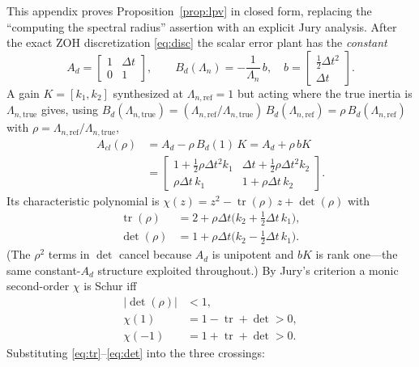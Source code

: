 This appendix proves Proposition~\ref{prop:lpv} in closed form, replacing the ``computing the spectral radius'' assertion with an explicit Jury 
analysis. After the exact ZOH discretization \eqref{eq:disc} the scalar error plant has the \emph{constant}
\begin{equation*}
A_d=\begin{bmatrix}1&\Delta t\\0&1\end{bmatrix},\qquad
B_d(\Lambda_n)=-\frac1{\Lambda_n}\,b,\quad b=\begin{bmatrix}\tfrac12\Delta t^2\\[1pt]\Delta t\end{bmatrix}.
\end{equation*}
A gain $K=[k_1,k_2]$ synthesized at $\Lambda_{n,\text{ref}}=1$ but acting where the true inertia is $\Lambda_{n,\text{true}}$ gives, 
using $B_d(\Lambda_{n,\text{true}})=(\Lambda_{n,\text{ref}}/\Lambda_{n,\text{true}})\,B_d(\Lambda_{n,\text{ref}})=\rho\,B_d(\Lambda_{n,\text{ref}})$ 
with $\rho=\Lambda_{n,\text{ref}}/\Lambda_{n,\text{true}}$,
\begin{align}
A_{cl}(\rho)
&=A_d-\rho\,B_d(1)\,K=A_d+\rho\,bK \nonumber\\
&=\begin{bmatrix}
1+\tfrac12\rho\Delta t^2k_1 &
\Delta t+\tfrac12\rho\Delta t^2k_2\\[2pt]
\rho\Delta t\,k_1 &
1+\rho\Delta t\,k_2
\end{bmatrix}.
\label{eq:Aclrho}
\end{align}
Its characteristic polynomial is $\chi(z)=z^2-\operatorname{tr}(\rho)\,z+\det(\rho)$ with
\begin{align}
\operatorname{tr}(\rho)&=2+\rho\Delta t\big(k_2+\tfrac12\Delta t\,k_1\big),\label{eq:tr}\\
\det(\rho)&=1+\rho\Delta t\big(k_2-\tfrac12\Delta t\,k_1\big).\label{eq:det}
\end{align}
(The $\rho^2$ terms in $\det$ cancel because $A_d$ is unipotent and $bK$ is rank one---the same constant-$A_d$ structure exploited throughout.) 
By Jury's criterion a monic second-order $\chi$ is Schur iff
\begin{align}
|\det(\rho)|&<1, \nonumber\\
\chi(1)&=1-\operatorname{tr}+\det>0, \nonumber\\
\chi(-1)&=1+\operatorname{tr}+\det>0.
\label{eq:jury}
\end{align}
Substituting \eqref{eq:tr}--\eqref{eq:det} into the three crossings:
